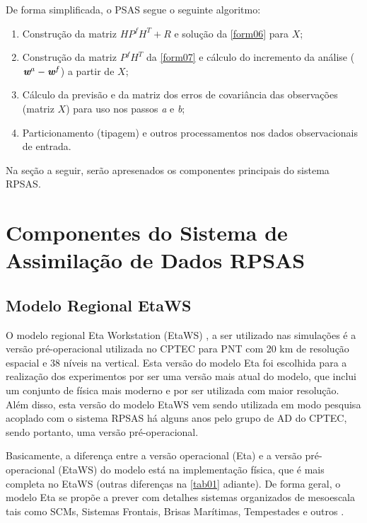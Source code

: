 De forma simplificada, o PSAS segue o seguinte algoritmo:

\begin{enumerate}
\item Construção da matriz $HP^{f}H^{T}+R$ e solução da \autoref{form06} para $X$;
\item Construção da matriz $P^{f}H^{T}$ da \autoref{form07} e cálculo do incremento da análise ($\textit{\textbf{w}}^a-\textit{\textbf{w}}^f$) a partir de $X$;
\item Cálculo da previsão e da matriz dos erros de covariância das observações (matriz $X$) para uso nos passos \textit{a} e \textit{b};
\item Particionamento (tipagem) e outros processamentos nos dados observacionais de entrada.
\end{enumerate}

Na seção a seguir, serão apresenados os componentes principais do sistema RPSAS.

\section{Componentes do Sistema de Assimilação de Dados RPSAS}
\label{ss:compsisassimdados}

\subsection{Modelo Regional EtaWS}

O modelo regional Eta Workstation (EtaWS) \cite{mesingeretal88}, \cite{black94} a ser utilizado nas \-si\-mu\-la\-ções é a versão pré-operacional utilizada no CPTEC para PNT com 20 km de resolução espacial e 38 níveis na vertical. Esta versão do modelo Eta foi escolhida para a realização dos experimentos por ser uma versão mais atual do modelo, que inclui um conjunto de física mais moderno e por ser utilizada com maior resolução. Além disso, esta versão do modelo EtaWS vem sendo utilizada em modo pesquisa acoplado com o sistema RPSAS há alguns anos pelo grupo de AD do CPTEC, sendo portanto, uma versão pré-operacional.

Basicamente, a diferença entre a versão operacional (Eta) e a versão pré-operacional (EtaWS) do modelo está na implementação física, que é mais completa no EtaWS (outras diferenças na \autoref{tab01} adiante). De forma geral, o modelo Eta se propõe a prever com detalhes sistemas organizados de mesoescala tais como SCMs, Sistemas Frontais, Brisas Marítimas, Tempestades e outros \cite{chou96}.


